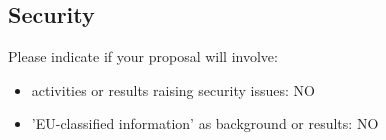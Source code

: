 \documentclass[a4paper,11pt]{article}
\begin{document}
\subsection{Security}

Please indicate if your proposal will involve:

\begin{itemize}
\item
activities or results raising security issues: NO
\item
'EU-classified information' as background or results: NO
\end{itemize}

\newpage

\label{bibliography}



\end{document}
